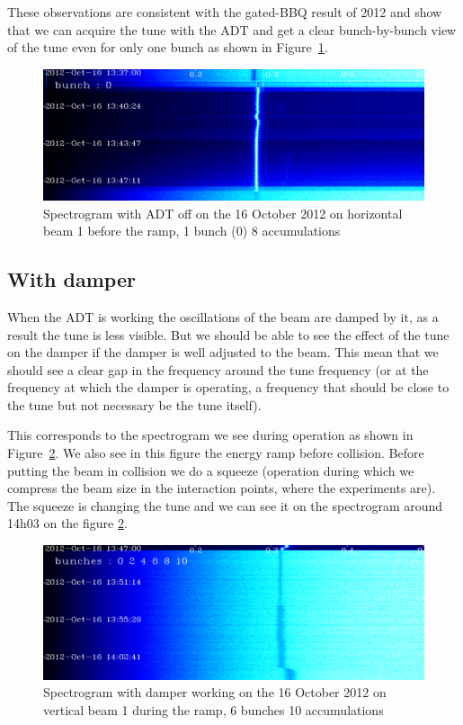 These observations are consistent with the gated-\gls{BBQ} result of 2012 \cite{Valuch12} and show that we can acquire the tune with the \gls{ADT} and get a clear bunch-by-bunch view of the tune even for only one bunch as shown in Figure~\ref{fig:bunch_0_adt_off}.

\begin{figure}[H]
\caption{Spectrogram with ADT off on the 16 October 2012 on horizontal beam 1 before the ramp, 1 bunch (0) 8 accumulations}
\label{fig:bunch_0_adt_off}
\centering
\includegraphics[scale=0.3]{md-121016-hb1-m1-bunch000001-8acc-1337-1349.pdf}
\end{figure}

\subsection{With damper}

When the \gls{ADT} is working the oscillations of the beam are damped by it, as a result the tune is less visible. But we should be able to see the effect of the tune on the damper if the damper is well adjusted to the beam. This mean that we should see a clear gap in the frequency around the tune frequency (or at the frequency at which the damper is operating, a frequency that should be close to the tune but not necessary be the tune itself).

This corresponds to the spectrogram we see during operation as shown in
Figure~\ref{fig:ramp}. We also see in this figure the energy ramp
before collision. Before putting the beam in collision we do a squeeze
(operation during which we compress the beam size in the interaction
points, where the experiments are). The squeeze is changing the tune
and we can see it on the spectrogram around 14h03 on the figure
\ref{fig:ramp}.

\begin{figure}[H]
\caption{Spectrogram with damper working on the 16 October 2012 on vertical beam 1 during the ramp, 6 bunches 10 accumulations}
\centering
\label{fig:ramp}
\includegraphics[scale=0.3]{md-121016-vb1-m1-6bunches-10acc-1347-1405-ramp.pdf}
\end{figure}

